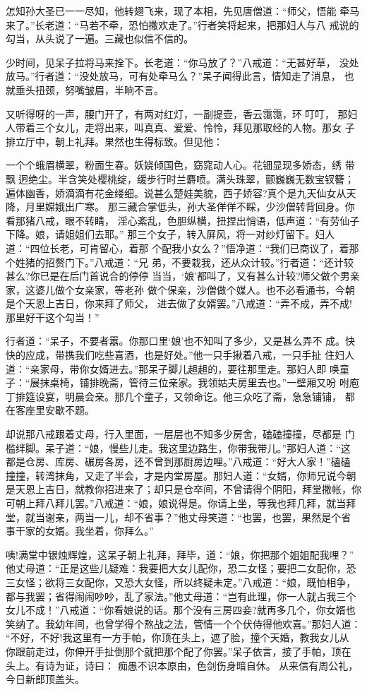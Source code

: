 怎知孙大圣已一一尽知，他转翅飞来，现了本相，先见唐僧道：“师父，悟能
牵马来了。”长老道：“马若不牵，恐怕撒欢走了。”行者笑将起来，把那妇人与八
戒说的勾当，从头说了一遍。三藏也似信不信的。

少时间，见呆子拉将马来拴下。长老道：“你马放了？”八戒道：“无甚好草，
没处放马。”行者道：“没处放马，可有处牵马么？”呆子闻得此言，情知走了消息，
也就垂头扭颈，努嘴皱眉，半晌不言。

又听得呀的一声，腰门开了，有两对红灯，一副提壶，香云霭霭，环叮叮，
那妇人带着三个女儿，走将出来，叫真真、爱爱、怜怜，拜见那取经的人物。那女
子排立厅中，朝上礼拜。果然也生得标致。但见他：

一个个蛾眉横翠，粉面生春。妖娆倾国色，窈窕动人心。花钿显现多娇态，绣
带飘迥绝尘。半含笑处樱桃绽，缓步行时兰麝喷。满头珠翠，颤巍巍无数宝钗簪；
遍体幽香，娇滴滴有花金缕细。说甚么楚娃美貌，西子娇容?真个是九天仙女从天
降，月里嫦娥出广寒。
那三藏合掌低头，孙大圣佯佯不睬，少沙僧转背回身。你看那猪八戒，眼不转睛，
淫心紊乱，色胆纵横，扭捏出悄语，低声道：“有劳仙子下降。娘，请姐姐们去耶。”
那三个女子，转入屏风，将一对纱灯留下。妇人道：“四位长老，可肯留心，着那
个配我小女么？”悟净道：“我们已商议了，着那个姓猪的招赘门下。”八戒道：“兄
弟，不要栽我，还从众计较。”行者道：“还计较甚么?你已是在后门首说合的停停
当当，‘娘’都叫了，又有甚么计较?师父做个男亲家，这婆儿做个女亲家，等老孙
做个保亲，沙僧做个媒人。也不必看通书，今朝是个天恩上吉日，你来拜了师父，
进去做了女婿罢。”八戒道：“弄不成，弄不成!那里好干这个勾当！”

行者道：“呆子，不要者嚣。你那口里‘娘’也不知叫了多少，又是甚么弄不
成。快快的应成，带携我们吃些喜酒，也是好处。”他一只手揪着八戒，一只手扯
住妇人道：“亲家母，带你女婿进去。”那呆子脚儿趄趄的，要往那里走。那妇人即
唤童子：“展抹桌椅，铺排晚斋，管待三位亲家。我领姑夫房里去也。”一壁厢又吩
咐庖丁排筵设宴，明晨会亲。那几个童子，又领命讫。他三众吃了斋，急急铺铺，
都在客座里安歇不题。

却说那八戒跟着丈母，行入里面，一层层也不知多少房舍，磕磕撞撞，尽都是
门槛绊脚。呆子道：“娘，慢些儿走。我这里边路生，你带我带儿。”那妇人道：“这
都是仓房、库房、碾房各房，还不曾到那厨房边哩。”八戒道：“好大人家！”磕磕
撞撞，转湾抹角，又走了半会，才是内堂房屋。那妇人道：“女婿，你师兄说今朝
是天恩上吉日，就教你招进来了；却只是仓卒间，不曾请得个阴阳，拜堂撒帐，你
可朝上拜八拜儿罢。”八戒道：“娘，娘说得是。你请上坐，等我也拜几拜，就当拜
堂，就当谢亲，两当一儿，却不省事？”他丈母笑道：“也罢，也罢，果然是个省
事干家的女婿。我坐着，你拜么。”

咦!满堂中银烛辉煌，这呆子朝上礼拜，拜毕，道：“娘，你把那个姐姐配我哩？”
他丈母道：“正是这些儿疑难：我要把大女儿配你，恐二女怪；要把二女配你，恐
三女怪；欲将三女配你，又恐大女怪，所以终疑未定。”八戒道：“娘，既怕相争，
都与我罢；省得闹闹吵吵，乱了家法。”他丈母道：“岂有此理，你一人就占我三个
女儿不成！”八戒道：“你看娘说的话。那个没有三房四妾?就再多几个，你女婿也
笑纳了。我幼年间，也曾学得个熬战之法，管情一个个伏侍得他欢喜。”那妇人道：
“不好，不好!我这里有一方手帕，你顶在头上，遮了脸，撞个天婚，教我女儿从
你跟前走过，你伸开手扯倒那个就把那个配了你罢。”呆子依言，接了手帕，顶在
头上。有诗为证，诗曰：
痴愚不识本原由，色剑伤身暗自休。
从来信有周公礼，今日新郎顶盖头。

